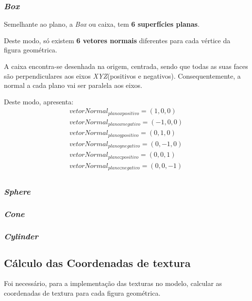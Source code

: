 \documentclass[relatorio.tex]{subfiles}
\begin{document}
\subsubsection{\textit{Box}}

Semelhante ao plano, a \textit{Box} ou caixa, 
tem \textbf{6 superfícies planas}.

Deste modo, só existem \textbf{6 vetores normais} 
diferentes para cada vértice da figura geométrica.

A caixa encontra-se desenhada na origem, centrada,
sendo que todas as suas faces são perpendiculares
aos eixos \textit{XYZ}(positivos e negativos).
Consequentemente, a normal a cada plano vai ser 
paralela aos eixos.

Deste modo, apresenta:
\begin{eqnarray}
    vetorNormal_{plano x positivo} = (1,0,0) \\
    vetorNormal_{plano x negativo} = (-1,0,0) \\
    vetorNormal_{plano y positivo} = (0,1,0) \\
    vetorNormal_{plano y negativo} = (0,-1,0) \\
    vetorNormal_{plano z positivo} = (0,0,1) \\
    vetorNormal_{plano z negativo} = (0,0,-1) \\
\end{eqnarray}

\subsubsection{\textit{Sphere}}

\subsubsection{\textit{Cone}}

\subsubsection{\textit{Cylinder}}


\subsection{Cálculo das Coordenadas de textura} \label{subsec:texCoord}
Foi necessário, para a implementação das texturas no modelo,
calcular as coordenadas de textura para cada figura geométrica.
\end{document}

